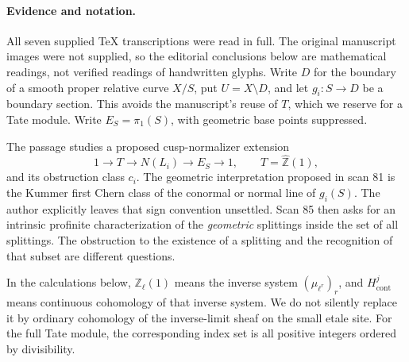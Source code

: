 \documentclass[11pt,a4paper]{article}
\theoremstyle{definition}
\begin{document}
\paragraph{Evidence and notation.}
All seven supplied TeX transcriptions were read in full.  The original
manuscript images were not supplied, so the editorial conclusions below are
mathematical readings, not verified readings of handwritten glyphs.  Write
\(D\) for the boundary of a smooth proper relative curve \(X/S\), put
\(U=X\setminus D\), and let \(g_i:S\longrightarrow D\) be a boundary section.
This avoids the manuscript's reuse of \(T\), which we reserve for a Tate module.
Write \(E_S=\pi_1(S)\), with geometric base points suppressed.

The passage studies a proposed cusp-normalizer extension
\begin{equation}\label{eq:arc-normalizer}
 1\longrightarrow T\longrightarrow N(L_i)
   \longrightarrow E_S\longrightarrow 1,
 \qquad T=\widehat{\mathbb Z}(1),
\end{equation}
and its obstruction class \(c_i\).  The geometric interpretation proposed in
scan 81 is the Kummer first Chern class of the conormal or normal line of
\(g_i(S)\).  The author explicitly leaves that sign convention unsettled.
Scan 85 then asks for an intrinsic profinite characterization of the
\emph{geometric} splittings inside the set of all splittings.  The obstruction
to the existence of a splitting and the recognition of that subset are
different questions.

In the calculations below, \(\mathbb Z_\ell(1)\) means the inverse system
\((\mu_{\ell^r})_r\), and \(H^j_{\mathrm{cont}}\) means continuous
cohomology of that inverse system.  We do not silently replace it by
ordinary cohomology of the inverse-limit sheaf on the small etale site.
For the full Tate module, the corresponding index set is all positive
integers ordered by divisibility.
\end{document}
